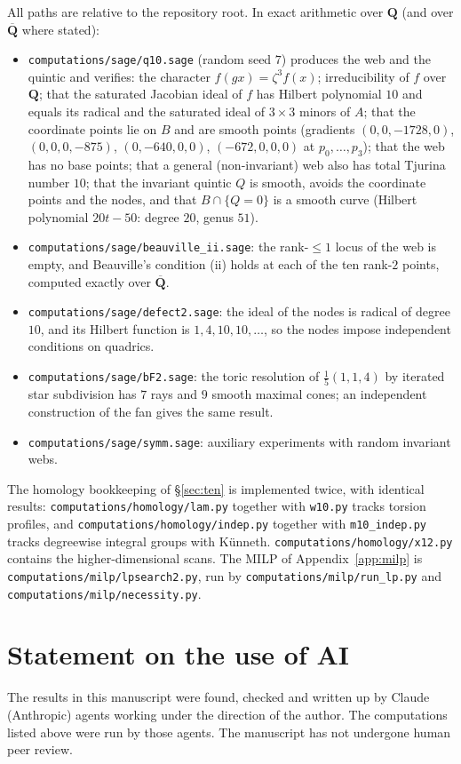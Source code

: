 \documentclass[11pt]{amsart}
\numberwithin{equation}{section}
\theoremstyle{definition}
\theoremstyle{remark}
\newcommand{\Q}{\mathbf Q}
\begin{document}
All paths are relative to the repository root. In exact arithmetic over
$\Q$ (and over $\overline{\Q}$ where stated):
\begin{itemize}
\item \nolinkurl{computations/sage/q10.sage} (random seed $7$) produces the web
  and the quintic and verifies: the character $f(gx)=\zeta^3f(x)$;
  irreducibility of $f$ over $\Q$; that the saturated Jacobian ideal of $f$
  has Hilbert polynomial $10$ and equals its radical and the saturated
  ideal of $3\times3$ minors of $A$; that the coordinate points lie on $B$
  and are smooth points (gradients $(0,0,-1728,0)$, $(0,0,0,-875)$,
  $(0,-640,0,0)$, $(-672,0,0,0)$ at $p_0,\dots,p_3$); that the web has no
  base points; that a general (non-invariant) web also has total Tjurina
  number $10$; that the invariant quintic $Q$ is smooth, avoids the
  coordinate points and the nodes, and that $B\cap\{Q=0\}$ is a smooth curve
  (Hilbert polynomial $20t-50$: degree $20$, genus $51$).
\item \nolinkurl{computations/sage/beauville_ii.sage}: the rank-$\le1$ locus
  of the web is empty, and Beauville's condition (ii) holds at each of the
  ten rank-$2$ points, computed exactly over $\overline{\Q}$.
\item \nolinkurl{computations/sage/defect2.sage}: the ideal of the nodes is
  radical of degree $10$, and its Hilbert function is $1,4,10,10,\dots$, so
  the nodes impose independent conditions on quadrics.
\item \nolinkurl{computations/sage/bF2.sage}: the toric resolution of
  $\frac15(1,1,4)$ by iterated star subdivision has $7$ rays and $9$ smooth
  maximal cones; an independent construction of the fan gives the same
  result.
\item \nolinkurl{computations/sage/symm.sage}: auxiliary experiments with
  random invariant webs.
\end{itemize}
The homology bookkeeping of \S\ref{sec:ten} is implemented twice, with
identical results: \nolinkurl{computations/homology/lam.py} together with
\texttt{w10.py} tracks torsion profiles, and
\nolinkurl{computations/homology/indep.py} together with
\texttt{m10\_indep.py} tracks degreewise integral groups with Künneth.
\nolinkurl{computations/homology/x12.py} contains the higher-dimensional
scans. The MILP of Appendix~\ref{app:milp} is
\nolinkurl{computations/milp/lpsearch2.py}, run by
\nolinkurl{computations/milp/run_lp.py} and \nolinkurl{computations/milp/necessity.py}.

\section*{Statement on the use of AI}
The results in this manuscript were found, checked and written up by
Claude (Anthropic) agents working under the direction of the author.
The computations listed above were run by those agents. The manuscript
has not undergone human peer review.

\printbibliography
\end{document}
